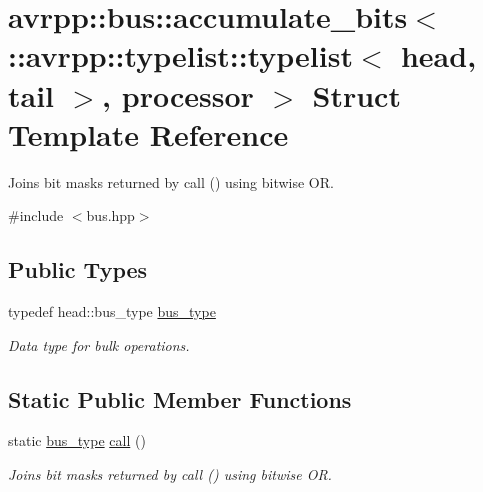 \hypertarget{structavrpp_1_1bus_1_1accumulate__bits_3_01_1_1avrpp_1_1typelist_1_1typelist_3_01head_00_01tail_01_4_00_01processor_01_4}{
\section{avrpp::bus::accumulate\_\-bits$<$ ::avrpp::typelist::typelist$<$ head, tail $>$, processor $>$ Struct Template Reference}
\label{structavrpp_1_1bus_1_1accumulate__bits_3_01_1_1avrpp_1_1typelist_1_1typelist_3_01head_00_01tail_01_4_00_01processor_01_4}
}


Joins bit masks returned by call () using bitwise OR.  




{\ttfamily \#include $<$bus.hpp$>$}

\subsection*{Public Types}
\begin{DoxyCompactItemize}
\item 
typedef head::bus\_\-type \hyperlink{structavrpp_1_1bus_1_1accumulate__bits_3_01_1_1avrpp_1_1typelist_1_1typelist_3_01head_00_01tail_01_4_00_01processor_01_4_a363b6617b91b0231de3b4c22a8a68661}{bus\_\-type}
\begin{DoxyCompactList}\small\item\em Data type for bulk operations. \item\end{DoxyCompactList}\end{DoxyCompactItemize}
\subsection*{Static Public Member Functions}
\begin{DoxyCompactItemize}
\item 
static \hyperlink{structavrpp_1_1bus_1_1accumulate__bits_3_01_1_1avrpp_1_1typelist_1_1typelist_3_01head_00_01tail_01_4_00_01processor_01_4_a363b6617b91b0231de3b4c22a8a68661}{bus\_\-type} \hyperlink{structavrpp_1_1bus_1_1accumulate__bits_3_01_1_1avrpp_1_1typelist_1_1typelist_3_01head_00_01tail_01_4_00_01processor_01_4_a791066d0ba1a310c978a60f8ebdb8c20}{call} ()
\begin{DoxyCompactList}\small\item\em Joins bit masks returned by call () using bitwise OR. \item\end{DoxyCompactList}\end{DoxyCompactItemize}


